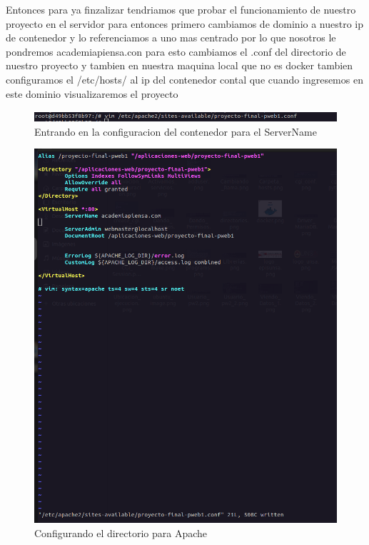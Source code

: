 Entonces para ya finzalizar tendriamos que probar el funcionamiento de nuestro proyecto en el servidor para entonces primero cambiamos de dominio a nuestro ip
de contenedor y lo referenciamos a uno mas centrado por lo que nosotros le pondremos academiapiensa.con para esto cambiamos el .conf del directorio de nuestro
proyecto y tambien en nuestra maquina local que no es docker tambien configuramos el /etc/hosts/ al ip del contenedor contal que cuando ingresemos en este dominio 
visualizaremos el proyecto 
\begin{figure}[H]
  \centering
  \includegraphics[width=1.0\textwidth]{img/Ingresando.png}
  \caption{Entrando en la configuracion del contenedor para el ServerName}
\end{figure}
\begin{figure}[H]
  \centering
  \includegraphics[width=1.0\textwidth]{img/Configuracion_ServerName.png}
  \caption{Configurando el directorio para Apache}
\end{figure}
